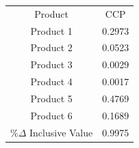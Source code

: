\begin{tabular}{cc}
Product & CCP \\
Product 1 & 0.2973 \\
Product 2 & 0.0523 \\
Product 3 & 0.0029 \\
Product 4 & 0.0017 \\
Product 5 & 0.4769 \\
Product 6 & 0.1689 \\
$\%\Delta$ Inclusive Value & 0.9975 \\
\end{tabular}